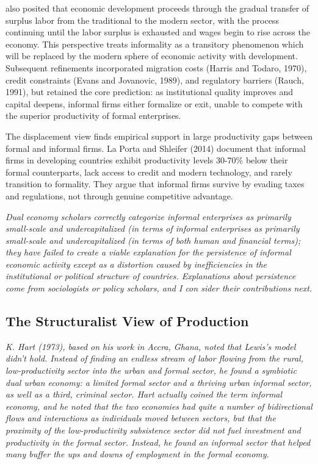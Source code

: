 \autocite{Lewis1954} also posited that economic development proceeds through the gradual transfer of surplus labor from the traditional to the modern sector, with the process continuing until the labor surplus is exhausted and wages begin to rise across the economy.
This perspective treats informality as a transitory phenomenon which will be replaced by the modern sphere of economic activity with development. Subsequent refinements incorporated migration costs (Harris and Todaro, 1970), credit constraints (Evans and Jovanovic, 1989), and regulatory barriers (Rauch, 1991), but retained the core prediction: as institutional quality improves and capital deepens, informal firms either formalize or exit, unable to compete with the superior productivity of formal enterprises.

The displacement view finds empirical support in large productivity gaps between formal and informal firms. La Porta and Shleifer (2014) document that informal firms in developing countries exhibit productivity levels 30-70\% below their formal counterparts, lack access to credit and modern technology, and rarely transition to formality. They argue that informal firms survive by evading taxes and regulations, not through genuine competitive advantage.

\textit{Dual economy scholars correctly categorize
informal enterprises as primarily small-scale and undercapitalized (in terms of
informal enterprises as primarily small-scale and undercapitalized (in terms of
both human and financial terms); they have failed to create a viable explanation
for the persistence of informal economic activity except as a distortion caused
by inefficiencies in the institutional or political structure of countries. Explanations about persistence come from sociologists or policy scholars, and I con
sider their contributions next.}

 \subsection{The Structuralist View of Production}
\textit{K. Hart (1973), based on his work in Accra, Ghana, noted that Lewis’s
model didn’t hold. Instead of finding an endless stream of labor flowing from the rural, low-productivity sector into the urban and formal sector, he
found a symbiotic dual urban economy: a limited formal sector and a thriving
urban informal sector, as well as a third, criminal sector. Hart actually coined
the term informal economy, and he noted that the two economies had quite a
number of bidirectional flows and interactions as individuals moved between
sectors, but that the proximity of the low-productivity subsistence sector did
not fuel investment and productivity in the formal sector. Instead, he found
an informal sector that helped many buffer the ups and downs of employment
in the formal economy.}

